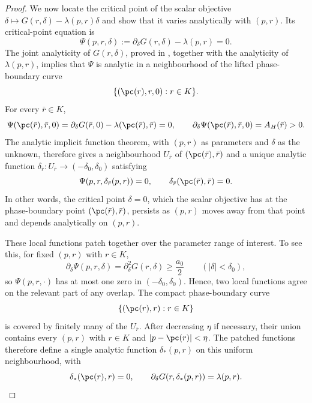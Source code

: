 \begin{proof}
We now locate the critical point of the scalar objective
\(\delta\mapsto G(r,\delta)-\lambda(p,r)\delta\) and show that it varies
analytically with \((p,r)\).  Its critical-point equation is
\[
  \Psi(p,r,\delta)
  :=
  \partial_\delta G(r,\delta)-\lambda(p,r)
  =0.
\]
The joint analyticity of \(G(r,\delta)\), proved in
, together with the analyticity of
\(\lambda(p,r)\), implies that \(\Psi\) is analytic in a neighbourhood of the
lifted phase-boundary curve
\[
  \{(\pc(r),r,0):r\in K\}.
\]
For every \(\bar r\in K\),
\[
  \Psi(\pc(\bar r),\bar r,0)
  =
  \partial_\delta G(\bar r,0)-\lambda(\pc(\bar r),\bar r)
  =0,
  \qquad
  \partial_\delta\Psi(\pc(\bar r),\bar r,0)
  =A_H(\bar r)>0.
\]
The analytic implicit function theorem, with \((p,r)\) as parameters and
\(\delta\) as the unknown, therefore gives a neighbourhood
\(U_{\bar r}\) of \((\pc(\bar r),\bar r)\) and a unique analytic function
\(\delta_{\bar r}:U_{\bar r}\to(-\delta_0,\delta_0)\) satisfying
\[
  \Psi(p,r,\delta_{\bar r}(p,r))=0,
  \qquad
  \delta_{\bar r}(\pc(\bar r),\bar r)=0.
\]
In other words, the critical point \(\delta=0\), which the scalar objective has
at the phase-boundary point \((\pc(\bar r),\bar r)\), persists as \((p,r)\)
moves away from that point and depends analytically on \((p,r)\).

These local functions patch together over the parameter range of interest.
To see this, for fixed \((p,r)\) with \(r\in K\),
\[
  \partial_\delta\Psi(p,r,\delta)=\partial_\delta^2G(r,\delta)
  \ge\frac{a_0}{2}
  \qquad (|\delta|<\delta_0),
\]
so \(\Psi(p,r,\cdot)\) has at most one zero in
\((-\delta_0,\delta_0)\).  Hence, two local functions agree on the relevant
part of any overlap.  The compact phase-boundary curve
\[
  \{(\pc(r),r):r\in K\}
\]
is covered by finitely many of the \(U_{\bar r}\).  After decreasing \(\eta\)
if necessary, their union contains every \((p,r)\) with \(r\in K\) and
\(|p-\pc(r)|<\eta\).  The patched functions therefore define a single
analytic function \(\delta_*(p,r)\) on this uniform neighbourhood, with
  \[
  \delta_*(\pc(r),r)=0,
  \qquad
  \partial_\delta G(r,\delta_*(p,r))=\lambda(p,r).
  \]


\end{proof}
